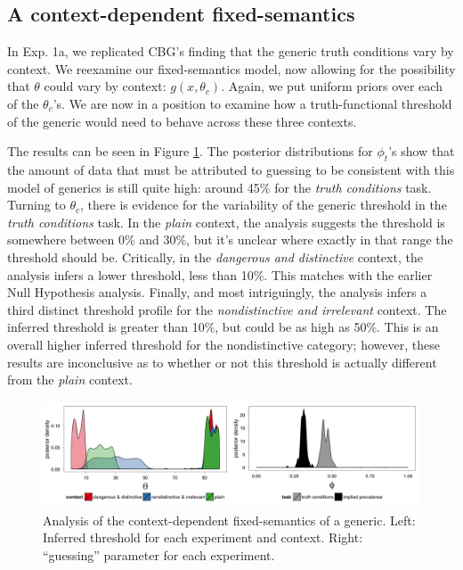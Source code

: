\documentclass[10pt,letterpaper]{article}
\begin{document}
\subsection{A context-dependent fixed-semantics}

In Exp. 1a, we replicated CBG's finding that the generic truth conditions vary by context. We reexamine our fixed-semantics model, now allowing for the possibility that $\theta$ could vary by context: $g(x,\theta_{c})$.
Again, we put uniform priors over each of the $\theta_{c}$'s. We are now in a position to examine how a truth-functional threshold of the generic would need to behave across these three contexts. 


The results can be seen in Figure \ref{fig:justFixed}. 
The posterior distributions for $\phi_{t}$'s show that the amount of data that must be attributed to guessing to be consistent with this model of generics is still quite high: around 45\% for the \emph{truth conditions} task. 
Turning to $\theta_{c}$, there is evidence for the variability of the generic threshold in the \emph{truth conditions} task. In the \emph{plain} context, the analysis suggests the threshold is somewhere between 0\% and 30\%, but it's unclear where exactly in that range the threshold should be. Critically, in the \emph{dangerous and distinctive} context, the analysis infers a lower threshold, less than 10\%. This matches with the earlier Null Hypothesis analysis. Finally, and most intriguingly, the analysis infers a third distinct threshold profile for the \emph{nondistinctive and irrelevant} context.  The inferred threshold is greater than 10\%, but could be as high as 50\%. This is an overall higher inferred threshold for the nondistinctive category; however, these results are inconclusive as to whether or not this threshold is actually different from the \emph{plain} context.



\begin{figure}
\centering
    \includegraphics[width=\columnwidth]{fixed_phis_thetas}
    \caption{Analysis of the context-dependent fixed-semantics of a generic. Left: Inferred threshold for each experiment and context. Right: ``guessing'' parameter for each experiment.}
  \label{fig:justFixed}
\end{figure}
\end{document}
